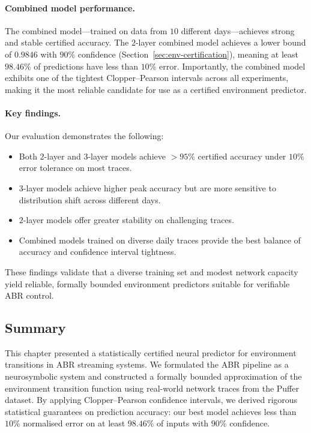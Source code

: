 \documentclass[thesis]{uofithesis} %
\begin{document}
    \paragraph{Combined model performance.}
    The combined model---trained on data from $10$ different days---achieves
    strong and stable certified accuracy.  The $2$-layer combined model
    achieves a lower bound of $0.9846$ with $90\%$ confidence
    (Section~\ref{sec:env-certification}), meaning at least $98.46\%$ of
    predictions have less than $10\%$ error.  Importantly, the combined
    model exhibits one of the tightest Clopper--Pearson intervals across
    all experiments, making it the most reliable candidate for use as a
    certified environment predictor.

    \paragraph{Key findings.}
    Our evaluation demonstrates the following:
    \begin{itemize}
        \item Both $2$-layer and $3$-layer models achieve $> 95\%$ certified
            accuracy under $10\%$ error tolerance on most traces.
        \item $3$-layer models achieve higher peak accuracy but are
            more sensitive to distribution shift across different days.
        \item $2$-layer models offer greater stability on challenging
            traces.
        \item Combined models trained on diverse daily traces provide the
            best balance of accuracy and confidence interval tightness.
    \end{itemize}
    These findings validate that a diverse training set and modest network
    capacity yield reliable, formally bounded environment predictors
    suitable for verifiable ABR control.


    \subsection{Summary}
    \label{sec:env-summary}

    This chapter presented a statistically certified neural predictor for
    environment transitions in ABR streaming systems.  We formulated the
    ABR pipeline as a neurosymbolic system and constructed a formally
    bounded approximation of the environment transition function using
    real-world network traces from the Puffer dataset.  By applying
    Clopper--Pearson confidence intervals, we derived rigorous statistical
    guarantees on prediction accuracy: our best model achieves less than
    $10\%$ normalised error on at least $98.46\%$ of inputs with $90\%$
    confidence.
\end{document}
